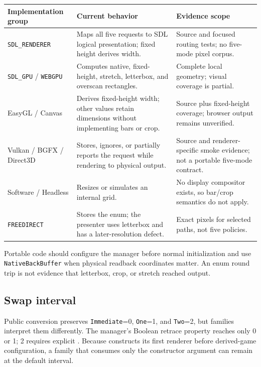 \begin{center}
\small
\begin{tabular}{@{}p{}p{}p{}@{}}
\toprule
\textbf{Implementation group} & \textbf{Current behavior} & \textbf{Evidence scope} \\
\midrule
\texttt{SDL\_RENDERER} & Maps all five requests to SDL logical presentation; fixed height derives width. & Source and focused routing tests; no five-mode pixel corpus. \\
\texttt{SDL\_GPU} / \texttt{WEBGPU} & Computes native, fixed-height, stretch, letterbox, and overscan rectangles. & Complete local geometry; visual coverage is partial. \\
EasyGL / Canvas & Derives fixed-height width; other values retain dimensions without implementing bars or crop. & Source plus fixed-height coverage; browser output remains unverified. \\
Vulkan / BGFX / Direct3D & Stores, ignores, or partially reports the request while rendering to physical output. & Source and renderer-specific smoke evidence; not a portable five-mode contract. \\
Software / Headless & Resizes or simulates an internal grid. & No display compositor exists, so bar/crop semantics do not apply. \\
\texttt{FREEDIRECT} & Stores the enum; the presenter uses letterbox and has a later-resolution defect. & Exact pixels for selected paths, not five policies. \\
\bottomrule
\end{tabular}
\end{center}

Portable code should configure the manager before normal initialization and use
\texttt{NativeBackBuffer} when physical readback coordinates matter. An enum round trip is not
evidence that letterbox, crop, or stretch reached output.

\subsection{Swap interval}
\label{sec:backend-swap-interval-matrix}

Public conversion preserves \texttt{Immediate}=0, \texttt{One}=1, and \texttt{Two}=2, but
families interpret them differently. The manager's Boolean retrace property reaches only 0 or 1;
2 requires explicit . Because  constructs its
first renderer before derived-game configuration, a family that consumes only the constructor
argument can remain at the default interval.

